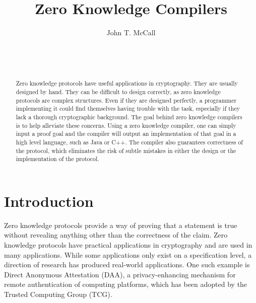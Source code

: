 \documentclass{sig-alternate}
\begin{document}

\title{Zero Knowledge Compilers}


\author{
\alignauthor
John T. McCall\\
	\\
	\\
	\\
}

\maketitle

\begin{abstract}
Zero knowledge protocols have useful applications in cryptography.
They are usually designed by hand. They can be difficult to
design correctly, as zero knowledge 
protocols are complex structures. Even if they are designed perfectly,
a programmer implementing it could find themselves having trouble
with the task, especially if they lack a thorough cryptographic background.
The goal behind zero knowledge compilers is to help alleviate these
concerns. Using a zero knowledge compiler, one can simply input a proof
goal and the compiler will output an implementation of that goal in a
high level language, such as Java or C++. The compiler also guarantees
correctness of the protocol, which eliminates the risk of subtle mistakes
in either the design or the implementation of the protocol.

\end{abstract}


\section{Introduction}
	Zero knowledge protocols provide a way of proving that a statement is true
	without revealing anything other than the correctness of the claim. Zero
	knowledge protocols have practical applications in cryptography and
	are used in many applications. While some applications only exist
	on a specification level, a direction of research has produced real-world
	applications. One such example is Direct Anonymous Attestation (DAA),
	a privacy-enhancing mechanism for remote authentication of computing
	platforms, which has been adopted by the Trusted Computing Group (TCG).
	
\end{document}
